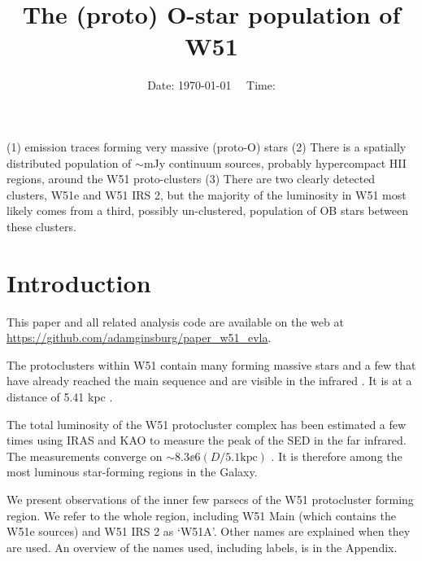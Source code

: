 



\title{The (proto) O-star population of W51}


\date{Date: \today ~~ Time: \currenttime}

\abstract
{}
{}
{}
{}
{
(1) \ortho \twotwo emission traces forming very massive (proto-O) stars
(2) There is a spatially distributed population of $\sim$mJy continuum sources,
probably hypercompact HII regions, around the W51 proto-clusters
(3) There are two clearly detected clusters, W51e and W51 IRS 2, but the
majority of the luminosity in W51 most likely comes from a third, possibly
un-clustered, population of OB stars between these clusters.
}

\maketitle


\section{Introduction}

This paper and all related analysis code are available on the web at
\url{https://github.com/adamginsburg/paper_w51_evla}.

The protoclusters within W51 contain many forming massive stars
\citep{Zhang1997a,Keto2008b,Zapata2008a,Zapata2009a,Zapata2010a,Goddi2015a,Shi2010a,Shi2010b}
and a few that have already reached the main sequence and are visible in the
infrared \citep{Barbosa2008a,Figueredo2008a}.
It is at a distance of 5.41 kpc \citep{Sato2010a,Xu2009a}.

The total luminosity of the W51 protocluster complex has been estimated a few
times using IRAS and KAO to measure the peak of the SED in the far infrared.
The measurements converge on $\sim8.3\ee{6} (D/5.1\mathrm{kpc})$ \lsun
\citep{Harvey1986a,Sievers1991a}.  It is therefore among the most luminous
star-forming regions in the Galaxy.

We present observations of the inner few parsecs of the W51 protocluster
forming region.  We refer to the whole region, including W51 Main (which
contains the W51e sources) and W51 IRS 2 as `W51A'.  Other names are explained
when they are used.  An overview of the names used, including labels, is in the
Appendix.

